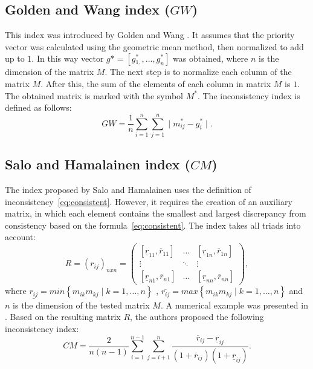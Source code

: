 \subsection{Golden and Wang index ($GW$)}

This index was introduced by Golden and Wang \cite{Golden1989}. It assumes that the priority vector was calculated using the geometric mean method, then normalized to add up to $1$. In this way vector $g*=[g{}_{1,}^{*},...,g_{n}^{*}]$ was obtained, where $n$ is the dimension of the matrix $M$. The next step is to normalize each column of the matrix $M$. After this, the sum of the elements of each column in matrix $M$ is $1$. The obtained matrix is marked with the symbol $M^{*}$. The inconsistency index is defined as follows:
	\begin{equation} 
		GW=\frac{1}{n}\sum_{i=1}^{n}\sum_{j=1}^{n}\mid m_{ij}^{*}-g_{i}^{*}\mid.
	 \end{equation}
 

\subsection{Salo and Hamalainen index ($CM$)}

The index proposed by Salo and Hamalainen \cite{SALO1995} uses the definition of inconsistency~\ref{eq:consistent}. However, it requires the creation of an auxiliary matrix, in which each element contains the smallest and largest discrepancy from consistency based on the formula~\ref{eq:consistent}. The index takes all triads into account:
	\begin{equation} 
		R=(r_{ij})_{nxn}=\left(\begin{array}{ccc}
			[\underline{r}_{11},\overline{r}_{11}] & \ldots & [\underline{r}_{1n},\overline{r}_{1n}]\\
			\vdots & \ddots & \vdots\\{}
			[\underline{r}_{n1},\overline{r}_{n1}] & \ldots & [\underline{r}_{nn},\overline{r}_{nn}]
		\end{array}\right),
	\end{equation}
 where $\underline{r_{ij}}=min\left\{ m_{ik}m_{kj}\mid k=1,\ldots,n\right\}$ , $\overline{r_{ij}}=max\left\{ m_{ik}m_{kj}\mid k=1,\ldots,n\right\}$ and $n$ is the dimension of the tested matrix $M$. A numerical example was presented in \cite{Brunelli2015}. Based on the resulting matrix $R$, the authors proposed the following inconsistency index:
 	\begin{equation} 
		CM=\frac{2}{n(n-1)}\sum_{i=1}^{n-1}\sum_{j=i+1}^{n}\frac{\overline{r}_{ij}-\underline{r}_{ij}}{\left(1+\overline{r}_{ij}\right)\left(1+\underline{r}_{ij}\right)}.
	 \end{equation}
 

